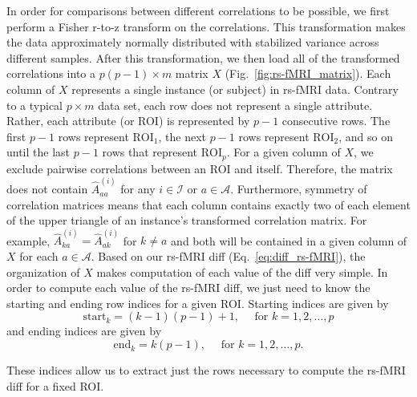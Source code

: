 \documentclass[10pt,letterpaper]{article}
\begin{document}
In order for comparisons between different correlations to be possible, we first perform a Fisher r-to-z transform on the correlations. This transformation makes the data approximately normally distributed with stabilized variance across different samples. After this transformation, we then load all of the transformed correlations into a $p(p-1) \times m$ matrix $X$ (Fig.~\ref{fig:rs-fMRI_matrix}). Each column of $X$ represents a single instance (or subject) in rs-fMRI data. Contrary to a typical $p \times m$ data set, each row does not represent a single attribute. Rather, each attribute (or ROI) is represented by $p - 1$ consecutive rows. The first $p - 1$ rows represent $\text{ROI}_1$, the next $p - 1$ rows represent $\text{ROI}_2$, and so on until the last $p - 1$ rows that represent $\text{ROI}_p$. For a given column of $X$, we exclude pairwise correlations between an ROI and itself. Therefore, the matrix does not contain $\hat{A}^{(i)}_{aa}$ for any $i \in \mathcal{I}$ or $a \in \mathcal{A}$. Furthermore, symmetry of correlation matrices means that each column contains exactly two of each element of the upper triangle of an instance's transformed correlation matrix. For example, $\hat{A}^{(i)}_{ka} = \hat{A}^{(i)}_{ak}$ for $k \neq a$ and both will be contained in a given column of $X$ for each $a \in \mathcal{A}$. Based on our rs-fMRI diff (Eq.~\ref{eq:diff_rs-fMRI}), the organization of $X$ makes computation of each value of the diff very simple. In order to compute each value of the rs-fMRI diff, we just need to know the starting and ending row indices for a given ROI. Starting indices are given by
%
\[
\text{start}_k = (k - 1)(p - 1) + 1, \quad \text{ for } k = 1,2,\dots,p
\]
%
and ending indices are given by
%
\[
\text{end}_k = k(p - 1), \quad \text{ for } k = 1,2,\dots,p.
\]

These indices allow us to extract just the rows necessary to compute the rs-fMRI diff for a fixed ROI. 

\bigskip

\begin{minipage}[c]{0.7\textwidth}\hspace{-0.6cm}
\end{minipage}\hspace{-0.8cm}
\begin{minipage}[c]{0.3\textwidth}
	\captionsetup{type=figure}\label{fig:rs-fMRI_matrix}
\end{minipage}
\end{document}
